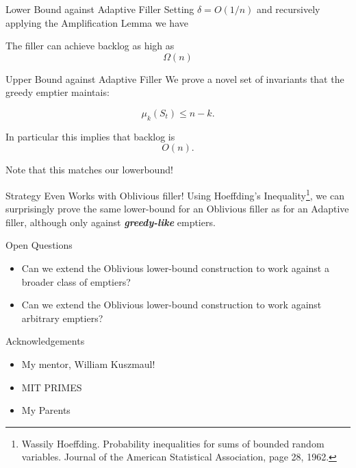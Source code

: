 \documentclass[xcolor=x11names, svgnames, rgb]{beamer}
\newcommand{\defn}[1]       {{\textit{\textbf{\boldmath #1}}}}
\begin{document}
\begin{frame}[t]{Lower Bound against Adaptive Filler}
  Setting $\delta = O(1/n)$ and recursively applying the Amplification Lemma we have 
  \begin{corollary}
    The filler can achieve backlog as high as
    $$\Omega(n)$$
  \end{corollary}
\end{frame}

\begin{frame}[t]{Upper Bound against Adaptive Filler}
  We prove a novel set of invariants that the greedy emptier maintais: 

  \begin{theorem}
    $$\mu_k(S_t) \le n-k.$$
  \end{theorem}

  \vspace{0.3cm}
  In particular this implies that backlog is $$O(n).$$

  \vspace{0.3cm}
  Note that this matches our lowerbound!
  
\end{frame}

\begin{frame}[t]{Strategy Even Works with Oblivious filler!}
  Using Hoeffding's Inequality\footnote{\tiny\color{blue} Wassily Hoeffding. Probability inequalities for sums of bounded random variables. Journal of the American Statistical Association, page 28, 1962.},
  we can surprisingly prove the same lower-bound
  for an Oblivious filler as for an Adaptive filler, although only against
  \defn{greedy-like} emptiers.
\end{frame}

\begin{frame}[t]{Open Questions}
  \begin{itemize}
    \item Can we extend the Oblivious lower-bound construction to work against a broader class of emptiers?
    \item Can we extend the Oblivious lower-bound construction to work against arbitrary emptiers?
  \end{itemize}
\end{frame}

\begin{frame}[t]{Acknowledgements}
  \begin{itemize}
    \item My mentor, William Kuszmaul!
    \item MIT PRIMES
    \item My Parents
 \end{itemize} 
\end{frame}
\end{document}
